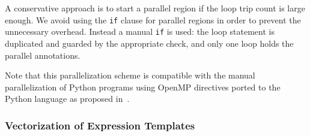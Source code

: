 \documentclass[10pt, preprint]{sigplanconf}
\begin{document}
%
%

A conservative approach is to start a parallel region if the loop trip
count is large enough. We avoid using the \texttt{if} clause for parallel
regions in order to prevent the unnecessary overhead. Instead a manual
\texttt{if} is used: the loop statement is duplicated and guarded by the appropriate
check, and only one loop holds the parallel annotations.

Note that this parallelization scheme is compatible with the manual
parallelization of Python programs using OpenMP directives ported to the Python
language as proposed in~\cite{pyhpc2013}.

\subsubsection{Vectorization of Expression Templates}
\end{document}
